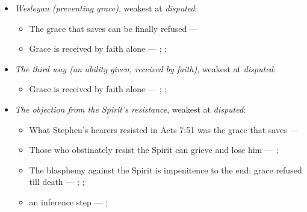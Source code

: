 \documentclass[11pt]{article}
\begin{document}
\begin{itemize}
\begin{itemize}
\item Conversion is God’s work alone: God regenerates, and the will does nothing to it --- \cite[Solid Declaration II.89]{concordia-triglotta-1921}; \cite[Solid Declaration II.90]{concordia-triglotta-1921}
\item Grace is received by faith alone --- \cite[Augsburg Confession IV.1–3]{concordia-triglotta-1921}; \cite[Sermon 1, III.1]{wesley-sermons-1872}; \cite[Trent, Session VI (1547), canon 9]{tanner-decrees-1990}
\end{itemize}
\item \emph{Wesleyan (preventing grace)}, weakest at \emph{disputed}:
\begin{itemize}
\item The grace that saves can be finally refused --- \cite[397]{wesley-works-9-1827}
\item Grace is received by faith alone --- \cite[Augsburg Confession IV.1–3]{concordia-triglotta-1921}; \cite[Sermon 1, III.1]{wesley-sermons-1872}; \cite[Trent, Session VI (1547), canon 9]{tanner-decrees-1990}
\end{itemize}
\item \emph{The third way (an ability given, received by faith)}, weakest at \emph{disputed}:
\begin{itemize}
\item Grace is received by faith alone --- \cite[Augsburg Confession IV.1–3]{concordia-triglotta-1921}; \cite[Sermon 1, III.1]{wesley-sermons-1872}; \cite[Trent, Session VI (1547), canon 9]{tanner-decrees-1990}
\end{itemize}
\item \emph{The objection from the Spirit’s resistance}, weakest at \emph{disputed}:
\begin{itemize}
\item What Stephen’s hearers resisted in Acts 7:51 was the grace that saves --- \cite[Five Arminian Articles (1610), art. 4]{schaff-creeds-christendom-3-1977}
\item Those who obstinately resist the Spirit can grieve and lose him --- \cite[Solid Declaration II.83]{concordia-triglotta-1921}; \cite[Solid Declaration XI.42]{concordia-triglotta-1921}
\item The blasphemy against the Spirit is impenitence to the end: grace refused till death --- \cite[325]{npnf1-06-1888}; \cite[II-II q.14 a.1]{aquinas-summa-1920}; \cite[74]{calvin-harmony-evangelists-2-1845}
\item an inference step --- \cite[325]{npnf1-06-1888}; \cite[On Rebuke and Grace, ch. 43]{npnf1-05-1887}

\end{itemize}
\end{itemize}
\end{document}
